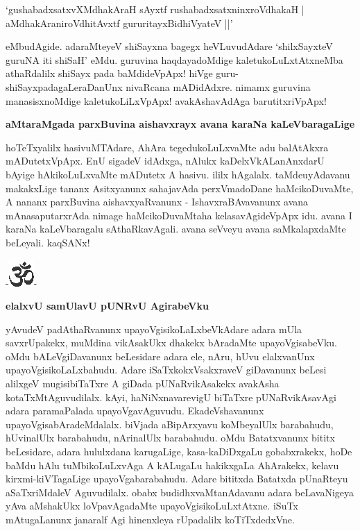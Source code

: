 \begin{shloka}
`gushabadxsatxvXMdhakAraH sAyxtf rushabadxsatxninxroVdhakaH |\\
aMdhakAraniroVdhitAvxtf gururitayxBidhiVyateV ||'
\end{shloka}

eMbudAgide. adaraMteyeV shiSayxna bagegx heVLuvudAdare `shilxSayxteV guruNA iti shiSaH' eMdu. guruvina haqdayadoMdige kaletukoLuLxtAtxneMba athaRdalilx shiSayx pada baMdideVpApx! hiVge guru- shiSayxpadagaLeraDanUnx nivaRcana mADidAdxre. nimamx guruvina manasisxnoMdige kaletukoLiLxVpApx! avakAshavAdAga barutitxriVpApx!

{\bf aMtaraMgada parxBuvina aishavxrayx avana karaNa kaLeVbaragaLige}

hoTeTxyalilx hasivuMTAdare, AhAra tegedukoLuLxvaMte adu balAtAkxra mADutetxVpApx. EnU sigadeV idAdxga, nAlukx kaDelxVkALanAnxdarU bAyige hAkikoLuLxvaMte mADutetx A hasivu. ililx hAgalalx. taMdeuyAdavanu makakxLige tananx Asitxyanunx sahajavAda perxVmadoDane haMcikoDuvaMte, A nananx parxBuvina aishavxyaRvanunx - IshavxraBAvavanunx avana mAnasaputarxrAda nimage haMcikoDuvaMtaha kelasavAgideVpApx idu. avana I karaNa kaLeVbaragalu sAthaRkavAgali. avana seVveyu avana saMkalapxdaMte beLeyali. kaqSANx!

\begin{center}
-\includegraphics{om.eps}-
\end{center}

{\bf elalxvU samUlavU pUNRvU AgirabeVku}

yAvudeV padAthaRvanunx upayoVgisikoLaLxbeVkAdare adara mUla savxrUpakekx, muMdina vikAsakUkx dhakekx bAradaMte upayoVgisabeVku. oMdu bALeVgiDavanunx beLesidare adara ele, nAru, hUvu elalxvanUnx upayoVgisikoLaLxbahudu. Adare iSaTxkokxVsakxraveV giDavanunx beLesi alilxgeV mugisibiTaTxre A giDada pUNaRvikAsakekx avakAsha kotaTxMtAguvudilalx. kAyi, haNiNxnavarevigU biTaTxre pUNaRvikAsavAgi adara paramaPalada upayoVgavAguvudu. EkadeVshavanunx upayoVgisabAradeMdalalx. biVjada aBipArxyavu koMbeyalUlx barabahudu, hUvinalUlx barabahudu, nArinalUlx barabahudu. oMdu Batatxvanunx bititx beLesidare, adara hululxdana karugaLige, kasa-kaDiDxgaLu gobabxrakekx, hoDe baMdu hAlu tuMbikoLuLxvAga A kALugaLu hakikxgaLa AhArakekx, kelavu kirxmi-kiVTagaLige upayoVgabarabahudu. Adare bititxda Batatxda pUnaRteyu aSaTxriMdaleV Aguvudilalx. obabx budidhxvaMtanAdavanu adara beLavaNigeya yAva aMshakUkx loVpavAgadaMte upayoVgisikoLuLxtAtxne. iSuTx mAtugaLanunx janaralf Agi hinenxleya rUpadalilx koTiTxdedxVne.

